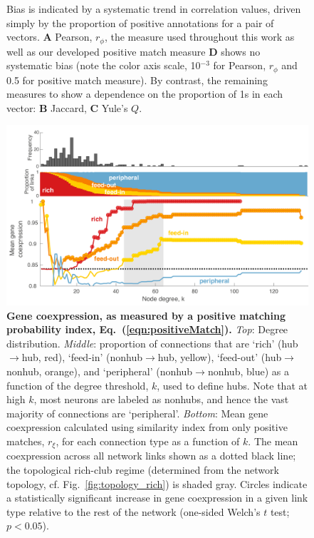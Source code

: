 \documentclass[10pt,letterpaper]{article}
\begin{document}
{\begin{figure}[h]
{Bias is indicated by a systematic trend in correlation values, driven simply by the proportion of positive annotations for a pair of vectors.
\textbf{A} Pearson, $r_\phi$, the measure used throughout this work as well as our developed positive match measure \textbf{D} shows no systematic bias (note the color axis scale, 10$^{-3}$ for Pearson, $r_\phi$ and 0.5 for positive match measure).
By contrast, the remaining measures to show a dependence on the proportion of 1s in each vector:
\textbf{B} Jaccard,
\textbf{C} Yule's $Q$.
}
\end{figure}
\begin{figure}[!h]
\centering
    \includegraphics[width=1\textwidth]{meanCoexpressionCoXALL.pdf}
\caption{
\textbf{Gene coexpression, as measured by a positive matching probability index, Eq.~(\ref{eqn:positiveMatch}).}
\emph{Top}: Degree distribution.
\emph{Middle}: proportion of connections that are `rich' (hub$\rightarrow$hub, red), `feed-in' (nonhub$\rightarrow$hub, yellow), `feed-out' (hub$\rightarrow$nonhub, orange), and `peripheral' (nonhub$\rightarrow$nonhub, blue) as a function of the degree threshold, $k$, used to define hubs.
Note that at high $k$, most neurons are labeled as nonhubs, and hence the vast majority of connections are `peripheral'.
\emph{Bottom}: Mean gene coexpression calculated using similarity index from only positive matches, $r_\xi$, for each connection type as a function of $k$.
The mean coexpression across all network links shown as a dotted black line; the topological rich-club regime (determined from the network topology, cf. Fig.~\ref{fig:topology_rich}) is shaded gray.
Circles indicate a statistically significant increase in gene coexpression in a given link type relative to the rest of the network (one-sided Welch's $t$ test; $p < 0.05$).
\label{fig:RFPposmatches}
}
\end{figure}

}
\end{document}
